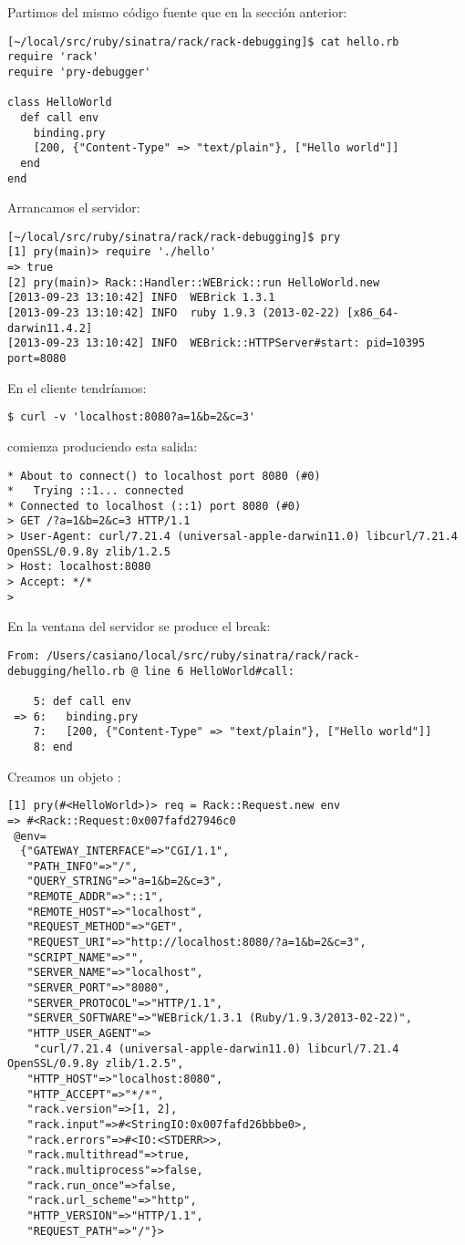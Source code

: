 Partimos del mismo código fuente que en la sección  anterior:
\begin{verbatim}
[~/local/src/ruby/sinatra/rack/rack-debugging]$ cat hello.rb 
require 'rack'
require 'pry-debugger'

class HelloWorld
  def call env
    binding.pry
    [200, {"Content-Type" => "text/plain"}, ["Hello world"]]
  end
end

\end{verbatim}
Arrancamos el servidor:
\begin{verbatim}
[~/local/src/ruby/sinatra/rack/rack-debugging]$ pry
[1] pry(main)> require './hello'
=> true
[2] pry(main)> Rack::Handler::WEBrick::run HelloWorld.new
[2013-09-23 13:10:42] INFO  WEBrick 1.3.1
[2013-09-23 13:10:42] INFO  ruby 1.9.3 (2013-02-22) [x86_64-darwin11.4.2]
[2013-09-23 13:10:42] INFO  WEBrick::HTTPServer#start: pid=10395 port=8080
\end{verbatim}
En el cliente tendríamos:
\begin{verbatim}
$ curl -v 'localhost:8080?a=1&b=2&c=3'
\end{verbatim}
comienza produciendo esta salida:
\begin{verbatim}
* About to connect() to localhost port 8080 (#0)
*   Trying ::1... connected
* Connected to localhost (::1) port 8080 (#0)
> GET /?a=1&b=2&c=3 HTTP/1.1
> User-Agent: curl/7.21.4 (universal-apple-darwin11.0) libcurl/7.21.4 OpenSSL/0.9.8y zlib/1.2.5
> Host: localhost:8080
> Accept: */*
> 
\end{verbatim}

En la ventana del servidor se produce el break:
\begin{verbatim}
From: /Users/casiano/local/src/ruby/sinatra/rack/rack-debugging/hello.rb @ line 6 HelloWorld#call:

    5: def call env
 => 6:   binding.pry
    7:   [200, {"Content-Type" => "text/plain"}, ["Hello world"]]
    8: end
\end{verbatim}


Creamos un objeto \rackrequest{}:
\begin{verbatim}
[1] pry(#<HelloWorld>)> req = Rack::Request.new env
=> #<Rack::Request:0x007fafd27946c0
 @env=
  {"GATEWAY_INTERFACE"=>"CGI/1.1",
   "PATH_INFO"=>"/",
   "QUERY_STRING"=>"a=1&b=2&c=3",
   "REMOTE_ADDR"=>"::1",
   "REMOTE_HOST"=>"localhost",
   "REQUEST_METHOD"=>"GET",
   "REQUEST_URI"=>"http://localhost:8080/?a=1&b=2&c=3",
   "SCRIPT_NAME"=>"",
   "SERVER_NAME"=>"localhost",
   "SERVER_PORT"=>"8080",
   "SERVER_PROTOCOL"=>"HTTP/1.1",
   "SERVER_SOFTWARE"=>"WEBrick/1.3.1 (Ruby/1.9.3/2013-02-22)",
   "HTTP_USER_AGENT"=>
    "curl/7.21.4 (universal-apple-darwin11.0) libcurl/7.21.4 OpenSSL/0.9.8y zlib/1.2.5",
   "HTTP_HOST"=>"localhost:8080",
   "HTTP_ACCEPT"=>"*/*",
   "rack.version"=>[1, 2],
   "rack.input"=>#<StringIO:0x007fafd26bbbe0>,
   "rack.errors"=>#<IO:<STDERR>>,
   "rack.multithread"=>true,
   "rack.multiprocess"=>false,
   "rack.run_once"=>false,
   "rack.url_scheme"=>"http",
   "HTTP_VERSION"=>"HTTP/1.1",
   "REQUEST_PATH"=>"/"}>
\end{verbatim}

